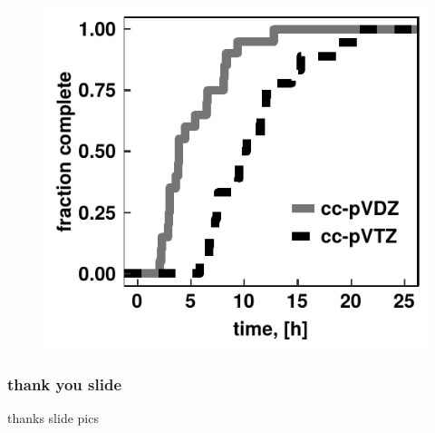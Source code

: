 \documentclass[xcolor=dvipsnames]{beamer}
\begin{document}
\begin{frame}
\begin{figure}[ht]
\begin{minipage}[b]{0.5\linewidth}
	\end{minipage}%
	\begin{minipage}[b]{0.5\linewidth}
		\centering
		\includegraphics[width=.6\linewidth]{img/timeVsBasis.pdf} 
	\end{minipage} 
\end{figure}
\end{frame}

\begin{frame}
\frametitle{thank you slide}
thanks slide pics
\end{frame}
\end{document}
